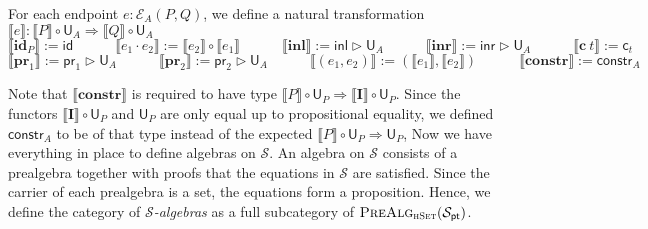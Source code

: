 \documentclass[9pt]{entcs}
\newcommand{\type}[1]{\textsc{#1}}
\newcommand{\constructor}[1]{\mathbf{#1}}
\newcommand{\category}[1]{\textsc{#1}}
\newcommand{\functortxt}[1]{\mathsf{#1}}
\newcommand{\nattranstxt}[1]{\mathsf{#1}}
\newcommand{\hset}{\type{hSet}} %
\newcommand{\0}{\textbf{0}} %
\newcommand{\Def}{:=} %
\newcommand{\compf}[2]{#2 \circ #1} %
\newcommand{\nattrans}[2]{#1 \Longrightarrow #2} %
\newcommand{\ctrans}[1]{\nattranstxt{c}_{#1}} %
\newcommand{\constrt}[1]{\nattranstxt{constr}_{#1}} %
\newcommand{\idt}[1]{\nattranstxt{id}} %
\newcommand{\compt}[2]{#2 \circ #1} %
\newcommand{\lwhisker}[2]{#2 \vartriangleright #1} %
\newcommand{\inlt}{\nattranstxt{inl}} %
\newcommand{\inrt}{\nattranstxt{inr}} %
\newcommand{\prlt}{\nattranstxt{pr}_1} %
\newcommand{\prrt}{\nattranstxt{pr}_2} %
\newcommand{\pairt}[2]{(#1 , #2)} %
\newcommand{\I}{\constructor{I}} %
\newcommand{\ep}[3]{\mathcal{E}_{#1}(#2,#3)} %
\newcommand{\id}[1]{\constructor{id}_{#1}} %
\newcommand{\comp}[2]{#1 \cdot #2} %
\newcommand{\inle}{\constructor{inl}} %
\newcommand{\inre}{\constructor{inr}} %
\newcommand{\prle}{\constructor{pr}_1} %
\newcommand{\prre}{\constructor{pr}_2} %
\newcommand{\pair}[2]{(#1 , #2)} %
\newcommand{\Ce}{\constructor{c}} %
\newcommand{\constr}{\constructor{constr}} %
\newcommand{\pt}[0]{\textsf{pt}}
\newcommand{\pointc}[1]{#1_{\pt}} %
\newcommand{\sig}{\mathcal{S}} %
\newcommand{\semP}[1]{\llbracket #1 \rrbracket} %
\newcommand{\prealg}[1]{\category{PreAlg}_{\hset}(#1)} %
\newcommand{\forget}[1]{\functortxt{U}_{#1}} %
\newcommand{\semE}[1]{\llbracket #1 \rrbracket} %
\newcommand{\remove}[1]{} %
\begin{document}
\begin{definition}
\label{def:semendpoint}
For each endpoint $e : \ep{A}{P}{Q}$, we define a natural transformation $\semE{e} : \nattrans{\compf{\forget{A}}{\semP{P}}} {\compf{\forget{A}}{\semP{Q}}}$
\[
\semE{\id{P}} \Def \idt{\compf{\forget{A}}{\semP{P}}}
\quad \quad \quad
\semE{\comp{e_1}{e_2}} \Def \compt{\semE{e_1}}{\semE{e_2}}
\quad \quad \quad
\semE{\inle} \Def \lwhisker{\forget{A}}{\inlt}
\quad \quad \quad
\semE{\inre} \Def \lwhisker{\forget{A}}{\inrt}
\quad \quad \quad
\semE{\Ce \> t} \Def \ctrans{t}
\]
\[
\semE{\prle} \Def \lwhisker{\forget{A}}{\prlt}
\quad \quad \quad
\semE{\prre} \Def \lwhisker{\forget{A}}{\prrt}
\quad \quad \quad
\semE{\pair{e_1}{e_2}} \Def \pairt{\semE{e_1}}{\semE{e_2}}
\quad \quad \quad
\semE{\constr} \Def \constrt{A}
\]
\remove{
\begin{itemize}
	\item $\semE{\id{P}} \Def \idt{\compf{\forget{A}}{\semP{P}}}$;
	\item $\semE{\comp{e_1}{e_2}} \Def \compt{\semE{e_1}}{\semE{e_2}}$;
	\item $\semE{\inle} \Def \lwhisker{\forget{A}}{\inlt}$;
	\item $\semE{\inre} \Def \lwhisker{\forget{A}}{\inrt}$;
	\item $\semE{\prle} \Def \lwhisker{\forget{A}}{\prlt}$;
	\item $\semE{\prre} \Def \lwhisker{\forget{A}}{\prrt}$;
	\item $\semE{\pair{e_1}{e_2}} \Def \pairt{\semE{e_1}}{\semE{e_2}}$;
	\item $\semE{\Ce \> t} \Def \ctrans{t}$;
	\item $\semE{\constr} \Def \constrt{A}$.
\end{itemize}
}
\end{definition}

Note that $\semE{\constr}$ is required to have type $\nattrans{\compf{\forget{P}}{\semP{P}}}{\compf{\forget{P}}{\semP{\I}}}$.
Since the functors $\compf{\forget{P}}{\semP{\I}}$ and $\forget{P}$ are only equal up to propositional equality, we defined $\constrt{A}$ to be of that type instead of the expected $\nattrans{\compf{\forget{P}}{\semP{P}}}{\forget{P}}$,
Now we have everything in place to define algebras on $\sig$.
An algebra on $\sig$ consists of a prealgebra together with proofs that the equations in $\sig$ are satisfied.
Since the carrier of each prealgebra is a set, the equations form a proposition.
Hence, we define the category of \emph{$\sig$-algebras} as a full subcategory of $\prealg{\pointc{\sig}}$.
\end{document}
